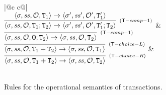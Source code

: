 \begin{figure}
\begin{tabular}{|@{}c c@{}|}
\hline 
{}\\[8pt]
$
\infer[{\scriptstyle{(\Tx-comp-1)}}]{\langle \thdstack, \h, \mathcal{O}, \trans_1 ; \trans_2 \rangle 
\rightarrow \langle  \thdstack', \h', \mathcal{O}', \trans_1' ; \trans_2 \rangle}
{\langle \thdstack, \h, \mathcal{O}, \trans_1 \rangle \rightarrow \langle \thdstack', \h', \mathcal{O}', \trans_1' \rangle}
$
&
$
\infer[{\scriptstyle{(\Tx-comp-1)}}]{\langle \thdstack, \h, \mathcal{O}, \nil ; \trans_2 \rangle 
\rightarrow \langle  \thdstack, \h, \mathcal{O}, \trans_2 \rangle}
{}
$
\\[8pt]
$
\infer[{\scriptstyle{(\Tx-choice-L)}}]{\langle \thdstack, \h, \mathcal{O}, \trans_1 + \trans_2 \rangle 
\rightarrow \langle  \thdstack, \h, \mathcal{O}, \trans_1 \rangle}{}
$
& 
$
\infer[{\scriptstyle{(\Tx-choice-R)}}]{\langle \thdstack, \h, \mathcal{O}, \trans_1 + \trans_2 \rangle 
\rightarrow \langle  \thdstack, \h, \mathcal{O}, \trans_2 \rangle}{}
$
\\[8pt]
\\
\hline
\end{tabular}
\caption{Rules for the operational semantics of transactions.}
\label{fig:opsem.tx}
\end{figure}
